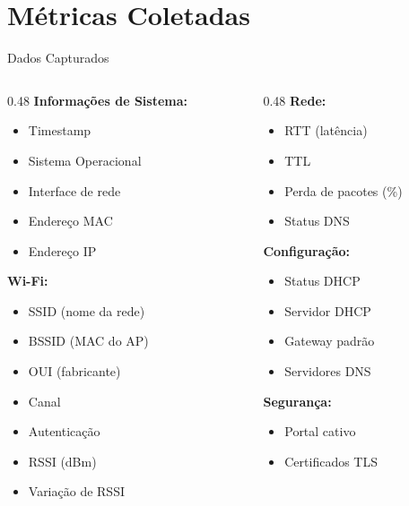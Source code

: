 \documentclass[aspectratio=169]{beamer}
\begin{document}
\section{Métricas Coletadas}

\begin{frame}{Dados Capturados}
\begin{columns}[T]
\begin{column}{0.48\textwidth}
\textbf{Informações de Sistema:}
\begin{itemize}
    \item Timestamp
    \item Sistema Operacional
    \item Interface de rede
    \item Endereço MAC
    \item Endereço IP
\end{itemize}

\vspace{0.3cm}

\textbf{Wi-Fi:}
\begin{itemize}
    \item SSID (nome da rede)
    \item BSSID (MAC do AP)
    \item OUI (fabricante)
    \item Canal
    \item Autenticação
    \item RSSI (dBm)
    \item Variação de RSSI
\end{itemize}
\end{column}

\begin{column}{0.48\textwidth}
\textbf{Rede:}
\begin{itemize}
    \item RTT (latência)
    \item TTL
    \item Perda de pacotes (\%)
    \item Status DNS
\end{itemize}

\vspace{0.3cm}

\textbf{Configuração:}
\begin{itemize}
    \item Status DHCP
    \item Servidor DHCP
    \item Gateway padrão
    \item Servidores DNS
\end{itemize}

\vspace{0.3cm}

\textbf{Segurança:}
\begin{itemize}
    \item Portal cativo
    \item Certificados TLS
\end{itemize}
\end{column}
\end{columns}
\end{frame}
\end{document}
